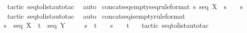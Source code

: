 \begin{isabellebody}
%
\isadelimproof
%
\endisadelimproof
%
\isatagproof
{}\isamarkupfalse%
\ {\isacharparenleft}tactic\ {\isacharverbatimopen}seq{\isacharunderscore}to{\isacharunderscore}list{\isacharunderscore}auto{\isacharunderscore}tac\ {}{\isacharverbatimclose}{\isacharparenright}\isanewline
{}\isamarkupfalse%
\ auto\isanewline
{}\isamarkupfalse%
%
\endisatagproof
{\isafoldproof}%
%
\isadelimproof
\isanewline
%
\endisadelimproof
\isanewline
{}\isamarkupfalse%
\ concatseq{\isacharunderscore}emptyseq{}{\isacharbrackleft}rule{\isacharunderscore}format{\isacharbrackright}{\isacharcolon}\ {\isachardoublequoteopen}s\ {\isacharcolon}seq\ X\ {\isacharminus}{\isacharminus}{\isachargreater}\ s\ {\isacharpercent}{\isacharampersand}{\isacharcircum}\ {\isacharpercent}{\isacharless}{\isacharpercent}{\isachargreater}\ {\isacharequal}\ s{\isachardoublequoteclose}\isanewline
%
\isadelimproof
%
\endisadelimproof
%
\isatagproof
{}\isamarkupfalse%
\ {\isacharparenleft}tactic\ {\isacharverbatimopen}seq{\isacharunderscore}to{\isacharunderscore}list{\isacharunderscore}auto{\isacharunderscore}tac\ {}{\isacharverbatimclose}{\isacharparenright}\isanewline
{}\isamarkupfalse%
\ auto\isanewline
{}\isamarkupfalse%
%
\endisatagproof
{\isafoldproof}%
%
\isadelimproof
\isanewline
%
\endisadelimproof
\isanewline
{}\isamarkupfalse%
\ concatseq{\isacharunderscore}is{\isacharunderscore}empty{\isacharbrackleft}rule{\isacharunderscore}format{\isacharbrackright}{\isacharcolon}\isanewline
{\isachardoublequoteopen}s\ {\isacharcolon}\ seq\ X\ {\isacharminus}{\isacharminus}{\isachargreater}\ t\ {\isacharcolon}\ seq\ Y\ {\isacharminus}{\isacharminus}{\isachargreater}\ \ \isanewline
\ \ {\isacharparenleft}s\ {\isacharpercent}{\isacharampersand}{\isacharcircum}\ t\ {\isacharequal}\ {\isacharpercent}{\isacharless}{\isacharpercent}{\isachargreater}{\isacharparenright}\ {\isacharequal}\ {\isacharparenleft}s\ {\isacharequal}\ {\isacharpercent}{\isacharless}{\isacharpercent}{\isachargreater}\ {\isacharampersand}\ t\ {\isacharequal}\ {\isacharpercent}{\isacharless}{\isacharpercent}{\isachargreater}{\isacharparenright}{\isachardoublequoteclose}\isanewline
%
\isadelimproof
%
\endisadelimproof
%
\isatagproof
{}\isamarkupfalse%
\ {\isacharparenleft}tactic\ {\isacharverbatimopen}seq{\isacharunderscore}to{\isacharunderscore}list{\isacharunderscore}auto{\isacharunderscore}tac\ {}{\isacharverbatimclose}{\isacharparenright}\isanewline
{}\isamarkupfalse%

\end{isabellebody}
